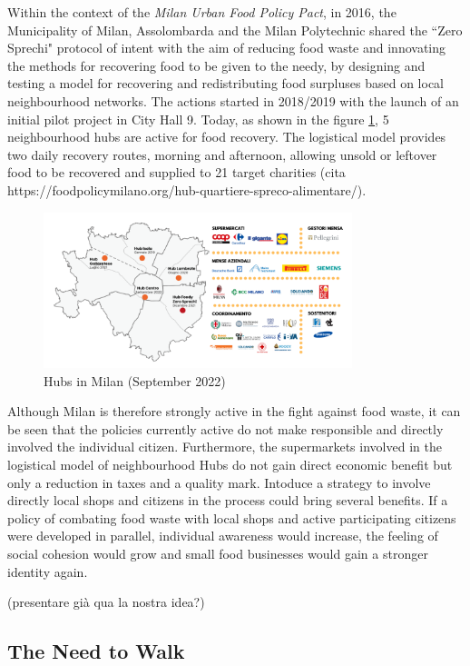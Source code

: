 Within the context of the \textit{Milan Urban Food Policy Pact}, in 2016, the Municipality of Milan, Assolombarda and the Milan Polytechnic shared the ``Zero Sprechi" protocol of intent with the aim of reducing food waste and innovating the methods for recovering food to be given to the needy, by designing and testing a model for recovering and redistributing food surpluses based on local neighbourhood networks. The actions started in 2018/2019 with the launch of an initial pilot project in City Hall 9. Today, as shown in the figure \ref{fig: hubs}, 5 neighbourhood hubs are active for food recovery. The logistical model provides two daily recovery routes, morning and afternoon, allowing unsold or leftover food to be recovered and supplied to 21 target charities  (cita https://foodpolicymilano.org/hub-quartiere-spreco-alimentare/). 

\begin{figure}[h!]
  \centering
  \includegraphics[width=9cm]{figs/hubs.png}
  \caption{Hubs in Milan (September 2022)}
  \label{fig: hubs}
\end{figure}

Although Milan is therefore strongly active in the fight against food waste, it can be seen that the policies currently active do not make responsible and directly involved the individual citizen. Furthermore, the supermarkets involved in the logistical model of neighbourhood Hubs do not gain direct economic benefit but only a reduction in taxes and a quality mark. Intoduce a strategy to involve directly local shops and citizens in the process could bring several benefits. If a policy of combating food waste with local shops and active participating citizens were developed in parallel, individual awareness would increase, the feeling of social cohesion would grow and small food businesses would gain a stronger identity again.

(presentare già qua la nostra idea?)

\subsection{The Need to Walk}

